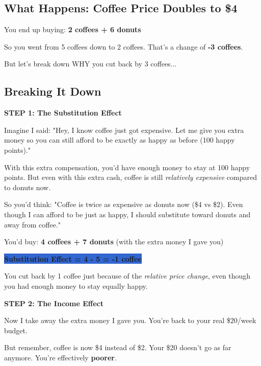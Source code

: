 \documentclass[12pt]{article}
\begin{document}
\subsection*{What Happens: Coffee Price Doubles to \$4}

You end up buying: \textbf{2 coffees + 6 donuts}

So you went from 5 coffees down to 2 coffees. That's a change of \textbf{-3 coffees}.

But let's break down WHY you cut back by 3 coffees...

\newpage

\subsection*{Breaking It Down}

\textbf{STEP 1: The Substitution Effect}

Imagine I said: "Hey, I know coffee just got expensive. Let me give you extra money so you can still afford to be exactly as happy as before (100 happy points)."

With this extra compensation, you'd have enough money to stay at 100 happy points. But even with this extra cash, coffee is still \textit{relatively expensive} compared to donuts now.

So you'd think: "Coffee is twice as expensive as donuts now (\$4 vs \$2). Even though I can afford to be just as happy, I should substitute toward donuts and away from coffee."

You'd buy: \textbf{4 coffees + 7 donuts} (with the extra money I gave you)

\vspace{0.3cm}

\colorbox{highlight}{\textbf{Substitution Effect = 4 - 5 = -1 coffee}}

\vspace{0.3cm}

You cut back by 1 coffee just because of the \textit{relative price change}, even though you had enough money to stay equally happy.

\vspace{0.5cm}

\textbf{STEP 2: The Income Effect}

Now I take away the extra money I gave you. You're back to your real \$20/week budget.

But remember, coffee is now \$4 instead of \$2. Your \$20 doesn't go as far anymore. You're effectively \textbf{poorer}.
\end{document}
